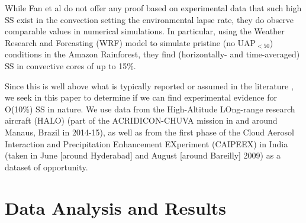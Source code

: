 \documentclass{article}
\begin{document}
While Fan et al do not offer any proof based on experimental data that such high SS exist in the convection setting the environmental lapse rate, they do observe comparable values in numerical simulations. In particular, using the Weather Research and Forcasting (WRF) model to simulate pristine (no UAP$_{<50}$) conditions in the Amazon Rainforest, they find (horizontally- and time-averaged) SS in convective cores of up to 15\%.

Since this is well above what is typically reported or assumed in the literature \cite{Hoppel1996, Yang2019, Koike2012, Politovich1988, Moteki2019, Siebert2017, Shen2018, Hammer2014, Li2019}, we seek in this paper to determine if we can find experimental evidence for O(10\%) SS in nature. We use data from the High-Altitude LOng-range research aircraft (HALO) (part of the ACRIDICON-CHUVA mission in and around Manaus, Brazil in 2014-15), as well as from the first phase of the Cloud Aerosol Interaction and Precipitation Enhancement EXperiment (CAIPEEX) in India (taken in June [around Hyderabad] and August [around Bareilly] 2009) \cite{???, Kulkarni2012} as a dataset of opportunity.

\section{Data Analysis and Results}
\end{document}
